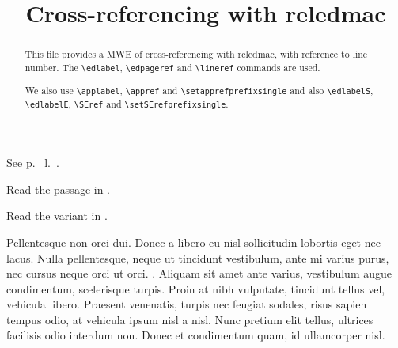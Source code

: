 \documentclass{article}
\begin{document}
\begin{english}
\title{Cross-referencing with reledmac}
\date{}
\maketitle
\begin{abstract}
This file provides a MWE of cross-referencing with reledmac, with reference to line number.
The \verb+\edlabel+, \verb+\edpageref+ and \verb+\lineref+ commands are used.

We also use \verb+\applabel+, \verb+\appref+ and \verb+\setapprefprefixsingle+
and also \verb+\edlabelS+, \verb+\edlabelE+, \verb+\SEref+ and \verb+\setSErefprefixsingle+.

\end{abstract}
\end{english}

See p.~ l.~.

Read the passage in .

Read the variant in .

\beginnumbering

\pstart
{}Pellentesque non orci dui. Donec a libero eu nisl sollicitudin lobortis eget nec lacus. Nulla pellentesque, neque ut tincidunt vestibulum, ante mi varius purus, nec cursus neque orci ut orci. . Aliquam sit amet ante varius, vestibulum augue condimentum, scelerisque turpis. Proin at nibh vulputate, tincidunt tellus vel, vehicula libero. Praesent venenatis, turpis nec feugiat sodales, risus sapien tempus odio, at vehicula ipsum nisl a nisl. Nunc pretium elit tellus, ultrices facilisis odio interdum non. Donec et condimentum quam, id ullamcorper nisl.
\pend

\endnumbering
\end{document}
